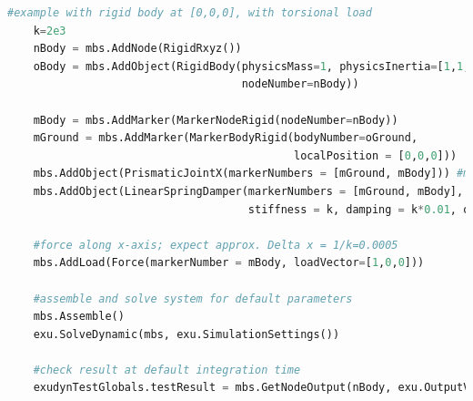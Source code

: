 \begin{lstlisting}[language=Python, firstnumber=1]
    #example with rigid body at [0,0,0], with torsional load
    k=2e3
    nBody = mbs.AddNode(RigidRxyz())
    oBody = mbs.AddObject(RigidBody(physicsMass=1, physicsInertia=[1,1,1,0,0,0], 
                                    nodeNumber=nBody))
    
    mBody = mbs.AddMarker(MarkerNodeRigid(nodeNumber=nBody))
    mGround = mbs.AddMarker(MarkerBodyRigid(bodyNumber=oGround, 
                                            localPosition = [0,0,0]))
    mbs.AddObject(PrismaticJointX(markerNumbers = [mGround, mBody])) #motion along ground X-axis
    mbs.AddObject(LinearSpringDamper(markerNumbers = [mGround, mBody], axisMarker0=[1,0,0],
                                     stiffness = k, damping = k*0.01, offset = 0))

    #force along x-axis; expect approx. Delta x = 1/k=0.0005
    mbs.AddLoad(Force(markerNumber = mBody, loadVector=[1,0,0])) 

    #assemble and solve system for default parameters
    mbs.Assemble()
    exu.SolveDynamic(mbs, exu.SimulationSettings())
    
    #check result at default integration time
    exudynTestGlobals.testResult = mbs.GetNodeOutput(nBody, exu.OutputVariableType.Displacement)[0]

\end{lstlisting}

\newpage

